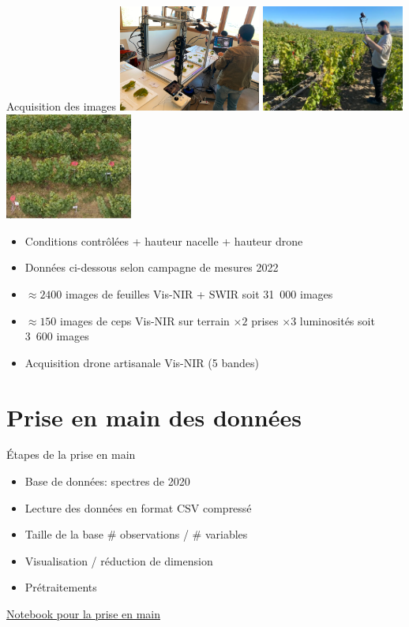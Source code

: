 \documentclass[presentation, aspectratio=169]{beamer}
\begin{document}
\begin{frame}{Acquisition des images}
  \includegraphics[height=35mm]{dispositif}
  \hfill
  \includegraphics[height=35mm]{champs}  
  \hfill
  \includegraphics[height=35mm]{drone}
  \begin{itemize}
  \item Conditions contrôlées + hauteur nacelle + hauteur drone
  \item Données ci-dessous selon campagne de mesures 2022
  \item $\approx2400$ images de feuilles Vis-NIR + SWIR soit 31\ 000
    images
  \item $\approx150$ images de ceps Vis-NIR sur terrain $\times2$
    prises $\times3$ luminosités soit 3\ 600 images
  \item Acquisition drone artisanale Vis-NIR (5 bandes)
  \end{itemize}
\end{frame}


\section{Prise en main des données}

\begin{frame}{Étapes de la prise en main}
  \begin{itemize}
  \item Base de données: spectres de 2020
  \item Lecture des données en format CSV compressé
  \item Taille de la base \# observations / \# variables
  \item Visualisation / réduction de dimension
  \item Prétraitements
  \end{itemize}

  \href{https://github.com/alban-goupil/jc-fare-2025/blob/main/notebooks/1-prise-en-main.ipynb}{Notebook
    pour la prise en main}
\end{frame}
\end{document}
